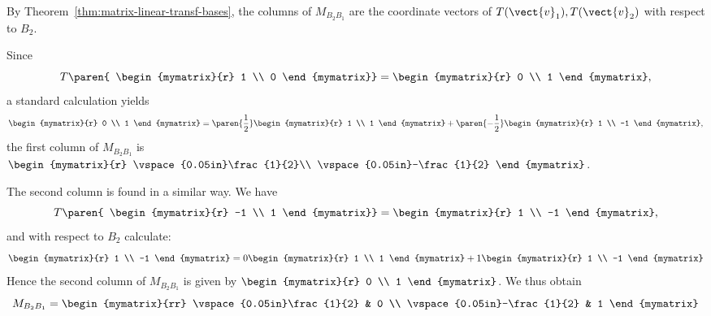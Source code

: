 \begin{solution}
By Theorem~\ref{thm:matrix-linear-transf-bases}, the columns of $M_{B_{2} B_{1}}$ are the
coordinate vectors of $T(\vect{v}_{1}), T(\vect{v}_{2})$ with respect
to $B_2$.

Since \[
T \paren{
\begin{mymatrix}{r}
1 \\
0
\end{mymatrix}}
= \begin{mymatrix}{r}
0 \\
1
\end{mymatrix} ,\]
a standard calculation yields
\[
 \begin{mymatrix}{r}
0 \\
1
\end{mymatrix}
 =
\paren{\frac{1}{2}}\begin{mymatrix}{r}
1 \\
1
\end{mymatrix}
+
\paren{-\frac{1}{2}}
\begin{mymatrix}{r}
1 \\
-1
\end{mymatrix},
\]
the first column of $M_{B_{2} B_{1}}$ is $\begin{mymatrix}{r}
\vspace{0.05in}\frac{1}{2}\\
\vspace{0.05in}-\frac{1}{2}
\end{mymatrix}$.

The second column is found in a similar way. We have
\[
T \paren{
\begin{mymatrix}{r}
-1 \\
1
\end{mymatrix}}
= \begin{mymatrix}{r}
1 \\
-1
\end{mymatrix} , \]
and with respect to $B_2$ calculate:
\[
\begin{mymatrix}{r}
1 \\
-1
\end{mymatrix}
=
0 \begin{mymatrix}{r}
1 \\
1
\end{mymatrix}
+
1
\begin{mymatrix}{r}
1 \\
-1
\end{mymatrix}
\]
Hence the second column of $M_{B_{2} B_{1}}$ is given by $\begin{mymatrix}{r}
0 \\
1
\end{mymatrix}$. We thus obtain
\[
M_{B_{2} B_{1}} = \begin{mymatrix}{rr}
\vspace{0.05in}\frac{1}{2} & 0 \\
\vspace{0.05in}-\frac{1}{2} & 1
\end{mymatrix} \]


\end{solution}
